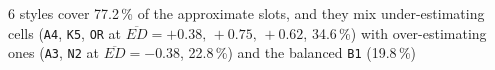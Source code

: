 6 styles cover 77.2\,\% of the approximate slots, and they mix under-estimating cells (\texttt{A4}, \texttt{K5}, \texttt{OR} at $\overline{ED}=+0.38,\,+0.75,\,+0.62$, 34.6\,\%) with over-estimating ones (\texttt{A3}, \texttt{N2} at $\overline{ED}=-0.38$, 22.8\,\%) and the balanced \texttt{B1} (19.8\,\%)